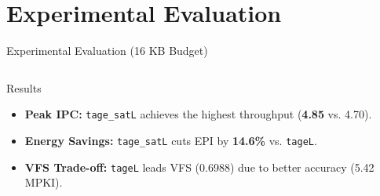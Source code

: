 \documentclass[aspectratio=169]{beamer}
\begin{document}
\section{Experimental Evaluation}
\begin{frame}[label=main_results]{Experimental Evaluation (16 KB Budget)}
    \begin{columns}[T]
        \begin{block}{Results}
            \begin{itemize}
                \item \textbf{Peak IPC:} \texttt{tage\_satL} achieves the highest throughput (\textbf{4.85} vs. 4.70).
                \item \textbf{Energy Savings:} \texttt{tage\_satL} cuts EPI by \textbf{14.6\%} vs. \texttt{tageL}.
                \item \textbf{VFS Trade-off:} \texttt{tageL} leads VFS (0.6988) due to better accuracy (5.42 MPKI).
            \end{itemize}
        \end{block}
        \begin{table}[H]
            \centering
            \caption{Mean results computed across the 12 representative benchmarks.}
        \end{table}
    \end{columns}
\end{frame}
\end{document}
